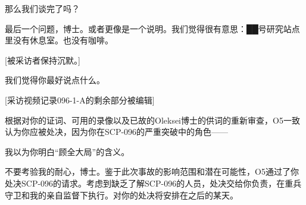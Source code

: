 \begin{scpbox}


那么我们谈完了吗？

最后一个问题，博士。或者更像是一个说明。我们觉得很有意思：██号研究站点里没有休息室。也没有咖啡。

{[}被采访者保持沉默。]

我们觉得你最好说点什么。

{[}采访视频记录096-1-A的剩余部分被编辑]


\end{scpbox}




\begin{scpbox}


根据对你的证词、可用的录像以及已故的Oleksei博士的供词的重新审查，O5一致认为你应被处决，因为你在SCP-096的严重突破中的角色——

我以为你明白“顾全大局”的含义。

不要考验我的耐心，博士。鉴于此次事故的影响范围和潜在可能性，O5通过了你处决SCP-096的请求。考虑到缺乏了解SCP-096的人员，处决交给你负责，在重兵守卫和我的亲自监督下执行。对你的处决将安排在之后的某天。


\end{scpbox}


